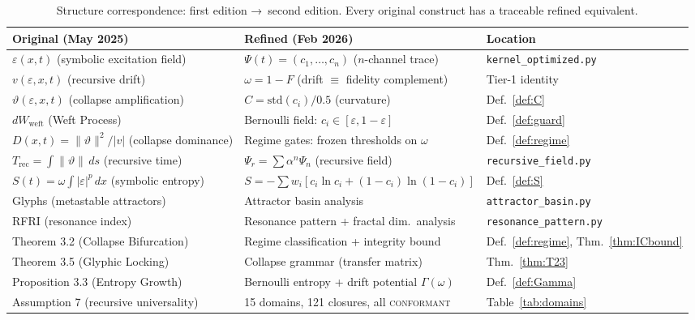 \documentclass[
  aps,
  prd,
  preprint,
  superscriptaddress,
  nofootinbib,
  floatfix,
  longbibliography
]{revtex4-2}
\newcommand{\Gam}{\Gamma}
\newcommand{\eps}{\varepsilon}
\newcommand{\regime}[1]{\textrm{\upshape\scshape#1}}
\newcommand{\conform}{\regime{conformant}}
\newcommand{\Fid}{F}
\newcommand{\Drft}{\omega}
\newcommand{\Ent}{S}
\newcommand{\Curv}{C}
\newcommand{\Psifield}{\Psi}
\newcommand{\Psirec}{\Psi_{r}}
\begin{document}
\begin{table}[t]
\centering
\small
\caption{Structure correspondence: first edition →\ second edition.
  Every original construct has a traceable refined equivalent.}
\label{tab:correspondence}
\begin{tabular}{@{}p{5.6cm}p{5.6cm}l@{}}
\toprule
\textbf{Original (May 2025)} &
\textbf{Refined (Feb 2026)} &
\textbf{Location} \\
\midrule
$\varepsilon(x,t)$ (symbolic excitation field) &
$\Psifield(t) = (c_1, \ldots, c_n)$ ($n$-channel trace) &
\texttt{kernel\_optimized.py} \\
$v(\varepsilon,x,t)$ (recursive drift) &
$\Drft = 1 - \Fid$ (drift $\equiv$ fidelity complement) &
Tier-1 identity \\
$\vartheta(\varepsilon,x,t)$ (collapse amplification) &
$\Curv = \mathrm{std}(c_i)/0.5$ (curvature) &
Def.~\ref{def:C} \\
$dW_{\mathrm{weft}}$ (Weft Process) &
Bernoulli field: $c_i \in [\eps, 1-\eps]$ &
Def.~\ref{def:guard} \\
$D(x,t) = \|\vartheta\|^2/|v|$ (collapse dominance) &
Regime gates: frozen thresholds on $\Drft$ &
Def.~\ref{def:regime} \\
$T_{\mathrm{rec}} = \int \|\vartheta\|\,ds$ (recursive time) &
$\Psirec = \sum \alpha^n \Psifield_n$ (recursive field) &
\texttt{recursive\_field.py} \\
$S(t) = \omega\int|\varepsilon|^p\,dx$ (symbolic entropy) &
$\Ent = -\sum w_i[c_i\ln c_i + (1-c_i)\ln(1-c_i)]$ &
Def.~\ref{def:S} \\
Glyphs (metastable attractors) &
Attractor basin analysis &
\texttt{attractor\_basin.py} \\
RFRI (resonance index) &
Resonance pattern + fractal dim.\ analysis &
\texttt{resonance\_pattern.py} \\
Theorem 3.2 (Collapse Bifurcation) &
Regime classification + integrity bound &
Def.~\ref{def:regime}, Thm.~\ref{thm:ICbound} \\
Theorem 3.5 (Glyphic Locking) &
Collapse grammar (transfer matrix) &
Thm.~\ref{thm:T23} \\
Proposition 3.3 (Entropy Growth) &
Bernoulli entropy + drift potential $\Gam(\Drft)$ &
Def.~\ref{def:Gamma} \\
Assumption 7 (recursive universality) &
15 domains, 121 closures, all \conform{} &
Table~\ref{tab:domains} \\
\bottomrule
\end{tabular}
\end{table}
\end{document}
